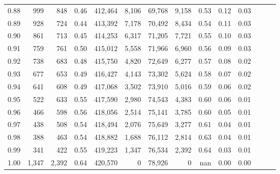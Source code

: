 \begin{tabular}{rrrrrrrrrrrrrr}
0.88 &     999 &    848 &  0.46 &  412,464 &    8,106 &  69,768 &   9,158 &  0.53 &  0.12 &      0.03 \\
0.89 &     928 &    724 &  0.44 &  413,392 &    7,178 &  70,492 &   8,434 &  0.54 &  0.11 &      0.03 \\
0.90 &     861 &    713 &  0.45 &  414,253 &    6,317 &  71,205 &   7,721 &  0.55 &  0.10 &      0.03 \\
0.91 &     759 &    761 &  0.50 &  415,012 &    5,558 &  71,966 &   6,960 &  0.56 &  0.09 &      0.03 \\
0.92 &     738 &    683 &  0.48 &  415,750 &    4,820 &  72,649 &   6,277 &  0.57 &  0.08 &      0.02 \\
0.93 &     677 &    653 &  0.49 &  416,427 &    4,143 &  73,302 &   5,624 &  0.58 &  0.07 &      0.02 \\
0.94 &     641 &    608 &  0.49 &  417,068 &    3,502 &  73,910 &   5,016 &  0.59 &  0.06 &      0.02 \\
0.95 &     522 &    633 &  0.55 &  417,590 &    2,980 &  74,543 &   4,383 &  0.60 &  0.06 &      0.01 \\
0.96 &     466 &    598 &  0.56 &  418,056 &    2,514 &  75,141 &   3,785 &  0.60 &  0.05 &      0.01 \\
0.97 &     438 &    508 &  0.54 &  418,494 &    2,076 &  75,649 &   3,277 &  0.61 &  0.04 &      0.01 \\
0.98 &     388 &    463 &  0.54 &  418,882 &    1,688 &  76,112 &   2,814 &  0.63 &  0.04 &      0.01 \\
0.99 &     341 &    422 &  0.55 &  419,223 &    1,347 &  76,534 &   2,392 &  0.64 &  0.03 &      0.01 \\
1.00 &   1,347 &  2,392 &  0.64 &  420,570 &        0 &  78,926 &       0 &   nan &  0.00 &      0.00 \\
\bottomrule
\end{tabular}

